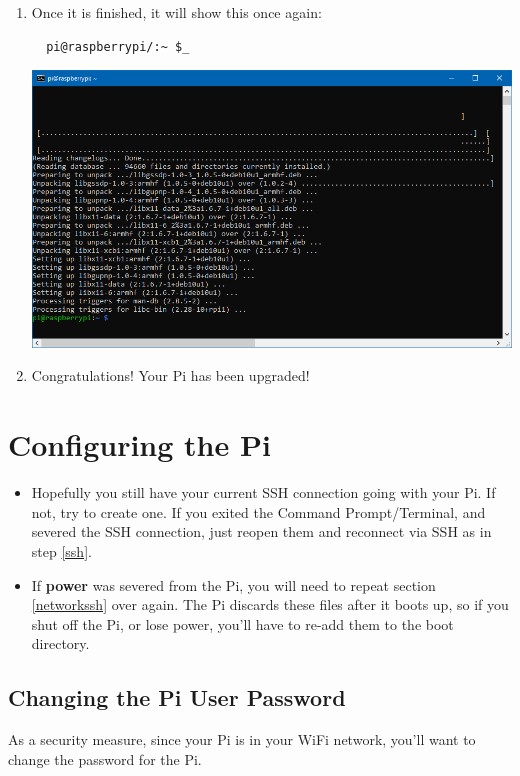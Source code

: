 \documentclass{article}
\begin{document}
\begin{enumerate}
  \item Once it is finished, it will show this once again:
  \begin{lstlisting}
  pi@raspberrypi/:~ $_ 
  \end{lstlisting}
  \includegraphics[width=1.00\textwidth]{aptupgradedone}
  \item Congratulations! Your Pi has been upgraded!
\end{enumerate}

\section{Configuring the Pi}

\begin{itemize}
  \item Hopefully you still have your current SSH connection going with your Pi. If not, try to create one. If you exited the Command Prompt/Terminal, and severed the SSH connection, just reopen them and reconnect via SSH as in step \ref{ssh}.
  \item If \textbf{power} was severed from the Pi, you will need to repeat section \ref{networkssh} over again. The Pi discards these files after it boots up, so if you shut off the Pi, or lose power, you'll have to re-add them to the boot directory.
\end{itemize}

\subsection{Changing the Pi User Password}

As a security measure, since your Pi is in your WiFi network, you'll want to change the password for the Pi.
\end{document}
